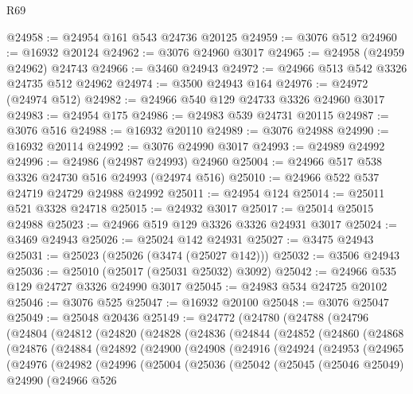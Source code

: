 \begin{lexlean}{R69}
\begin{coremodule}
@24958 := @24954 @161 @543 @24736 @20125
@24959 := @3076 @512
@24960 := @16932 @20124
@24962 := @3076 @24960 @3017
@24965 := @24958 (@24959 @24962) @24743
@24966 := @3460 @24943
@24972 := @24966 @513 @542 @3326 @24735 @512 @24962
@24974 := @3500 @24943 @164
@24976 := @24972 (@24974 @512)
@24982 := @24966 @540 @129 @24733 @3326 @24960 @3017
@24983 := @24954 @175
@24986 := @24983 @539 @24731 @20115
@24987 := @3076 @516
@24988 := @16932 @20110
@24989 := @3076 @24988
@24990 := @16932 @20114
@24992 := @3076 @24990 @3017
@24993 := @24989 @24992
@24996 := @24986 (@24987 @24993) @24960
@25004 := @24966 @517 @538 @3326 @24730 @516 @24993 (@24974 @516)
@25010 := @24966 @522 @537 @24719 @24729 @24988 @24992
@25011 := @24954 @124
@25014 := @25011 @521 @3328 @24718
@25015 := @24932 @3017
@25017 := @25014 @25015 @24988
@25023 := @24966 @519 @129 @3326 @3326 @24931 @3017
@25024 := @3469 @24943
@25026 := @25024 @142 @24931
@25027 := @3475 @24943
@25031 := @25023 (@25026 (@3474 (@25027 @142)))
@25032 := @3506 @24943
@25036 := @25010 (@25017 (@25031 @25032) @3092)
@25042 := @24966 @535 @129 @24727 @3326 @24990 @3017
@25045 := @24983 @534 @24725 @20102
@25046 := @3076 @525
@25047 := @16932 @20100
@25048 := @3076 @25047
@25049 := @25048 @20436
@25149 := @24772
    (@24780
      (@24788
        (@24796
          (@24804
            (@24812
              (@24820
                (@24828
                  (@24836
                    (@24844
                      (@24852
                        (@24860
                          (@24868
                            (@24876
                              (@24884
                                (@24892
                                  (@24900
                                    (@24908
                                      (@24916
                                        (@24924
                                          (@24953
                                            (@24965
                                              (@24976
                                                (@24982
                                                  (@24996
                                                    (@25004
                                                      (@25036
                                                        (@25042
                                                          (@25045
                                                            (@25046 @25049)
                                                            @24990
                                                            (@24966
                                                              @526

\end{coremodule}
\end{lexlean}
